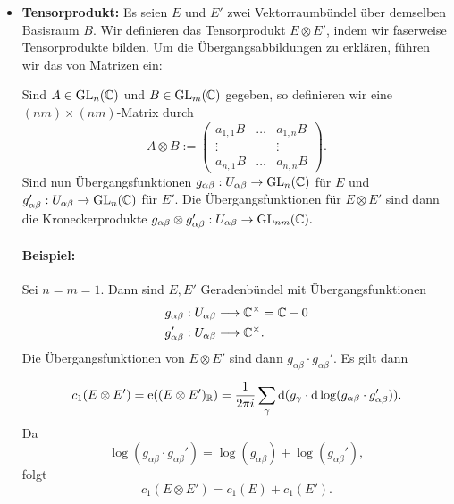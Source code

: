 \begin{itemize}
	\item \textbf{Tensorprodukt: } Es seien $E$ und $E'$ zwei Vektorraumbündel über demselben Basisraum $B$.
	Wir definieren das Tensorprodukt $E \otimes E'$, indem wir faserweise Tensorprodukte bilden.	
	Um die Übergangsabbildungen zu erklären, führen wir das  von Matrizen ein:
	
	Sind $A \in \mathrm{GL}_n(\mathbb{C})$ und $B \in \mathrm{GL}_m(\mathbb{C})$ gegeben, so definieren wir eine $(nm)\times (nm)$-Matrix durch
	\[A \otimes B := 
	\left(
	\begin{matrix}
	a_{1,1} B & \ldots & a_{1,n} B\\
	\vdots & & \vdots\\
	a_{n,1} B & \ldots & a_{n,n} B
	\end{matrix}
	\right). \]
	Sind nun Übergangsfunktionen $g_{\alpha \beta} : U_{\alpha \beta} \overset{}{\rightarrow} \mathrm{GL}_n(\mathbb{C})$ für $E$ und
	$g_{\alpha \beta}' : U_{\alpha \beta} \overset{}{\rightarrow} \mathrm{GL}_n(\mathbb{C})$ für $E'$. Die Übergangsfunktionen für $E\otimes E'$ sind dann die Kroneckerprodukte $g_{\alpha \beta} \otimes g_{\alpha \beta}' : U_{\alpha \beta} \overset{}{\rightarrow} \mathrm{GL}_{nm}(\mathbb{C}).$
	\paragraph{Beispiel:}
	Sei $n = m = 1$. Dann sind $E,E'$ Geradenbündel mit Übergangsfunktionen
	\begin{align*}
	g_{\alpha\beta} : U_{\alpha \beta} & \overset{}{\longrightarrow} \mathbb{C}^\times = \mathbb{C} - 0\\
	g_{\alpha\beta}' : U_{\alpha \beta} & \overset{}{\longrightarrow} \mathbb{C}^\times.\\
	\end{align*}
	Die Übergangsfunktionen von $E\otimes E'$ sind dann $g_{\alpha\beta}\cdot g_{\alpha\beta}'$. Es gilt dann
	
	\[c_1(E \otimes E') = \mathrm{e}((E \otimes E')_{\mathbb{R}}) = 
	\frac{1}{2\pi i} \sum_\gamma \text{d} (g_\gamma \cdot \text{d} \log (g_{\alpha \beta}\cdot g_{\alpha \beta}')).
	\]
	Da
	\[ \log (g_{\alpha \beta}\cdot g_{\alpha \beta}') = \log (g_{\alpha \beta}) + \log (g_{\alpha \beta}'),\]
	folgt
	\[ c_1(E\otimes E') = c_1(E) + c_1(E'). \]
\end{itemize}